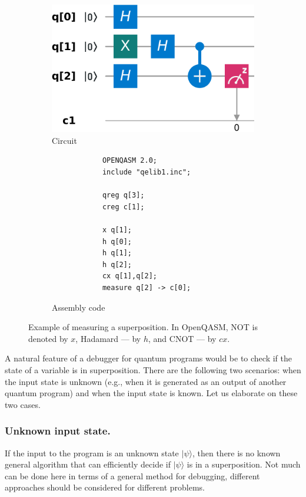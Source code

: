 \documentclass[11pt]{article}
\theoremstyle{plain}
\theoremstyle{definition}
\newcommand{\ldbrac}[1]{\lvert#1\rangle}
\begin{document}
\begin{figure}[h]
	\centering
	\begin{subfigure}[b]{4cm}
		\centering
		\includegraphics[width = \textwidth]{sup_coll_circuit.pdf}
		\caption{Circuit}
		\label{fig:spp-circ}
	\end{subfigure}
	\hspace*{1cm}
	\begin{subfigure}[b]{4cm}
		\centering
		\begin{verbatim}
            OPENQASM 2.0;
            include "qelib1.inc";
            
            qreg q[3];
            creg c[1];
            
            x q[1];
            h q[0];
            h q[1];
            h q[2];
            cx q[1],q[2];
            measure q[2] -> c[0];
        \end{verbatim}
		\caption{Assembly code}
		\label{fig:spp-code}
	\end{subfigure}
	\caption{Example of measuring a superposition. In OpenQASM, NOT is denoted by $x$, Hadamard --- 
	by $h$, and CNOT --- by $cx$. }
	\label{fig:spp}
\end{figure}

A natural feature of a debugger for quantum programs would be to check if the state 
of a variable is in superposition. There are the following two scenarios: when the input state is 
unknown (e.g., when it is generated as an output of another quantum program) and when the input 
state is known. Let us elaborate on these two cases.

\subsubsection{Unknown input state.}\label{sec:unknown-inp}
If the input to the program is an unknown state $\ldbrac{\psi}$, then there is no known general 
algorithm that can efficiently decide if $\ldbrac{\psi}$ is in a superposition. 
Not much can be done here in terms of a general method for debugging, 
different approaches should be considered for different problems.
\end{document}
